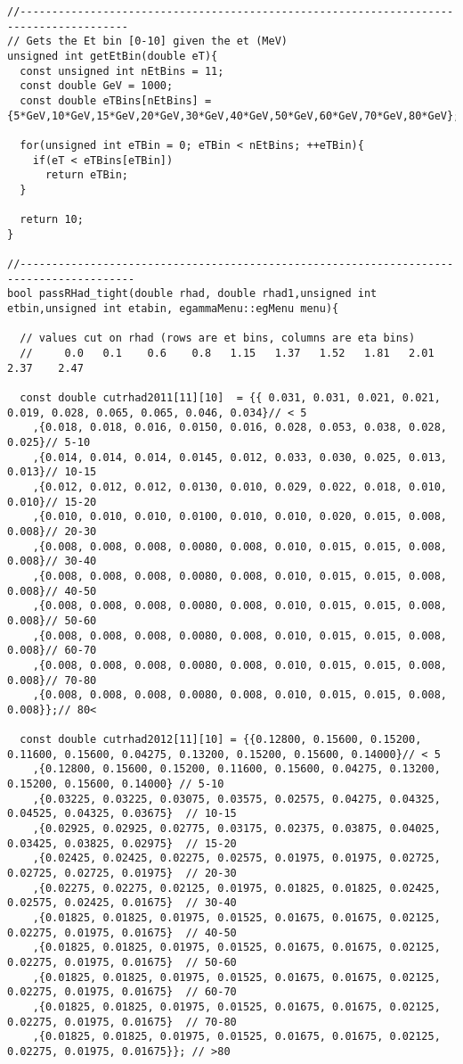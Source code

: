 \begin{lstlisting}
//---------------------------------------------------------------------------------------
// Gets the Et bin [0-10] given the et (MeV)
unsigned int getEtBin(double eT){
  const unsigned int nEtBins = 11;
  const double GeV = 1000;
  const double eTBins[nEtBins] = {5*GeV,10*GeV,15*GeV,20*GeV,30*GeV,40*GeV,50*GeV,60*GeV,70*GeV,80*GeV};
  
  for(unsigned int eTBin = 0; eTBin < nEtBins; ++eTBin){
    if(eT < eTBins[eTBin])
      return eTBin;
  }
  
  return 10;
}

//----------------------------------------------------------------------------------------
bool passRHad_tight(double rhad, double rhad1,unsigned int etbin,unsigned int etabin, egammaMenu::egMenu menu){
  
  // values cut on rhad (rows are et bins, columns are eta bins)
  //     0.0   0.1    0.6    0.8   1.15   1.37   1.52   1.81   2.01  2.37    2.47

  const double cutrhad2011[11][10]  = {{ 0.031, 0.031, 0.021, 0.021, 0.019, 0.028, 0.065, 0.065, 0.046, 0.034}// < 5
	,{0.018, 0.018, 0.016, 0.0150, 0.016, 0.028, 0.053, 0.038, 0.028, 0.025}// 5-10 
	,{0.014, 0.014, 0.014, 0.0145, 0.012, 0.033, 0.030, 0.025, 0.013, 0.013}// 10-15 
	,{0.012, 0.012, 0.012, 0.0130, 0.010, 0.029, 0.022, 0.018, 0.010, 0.010}// 15-20 
	,{0.010, 0.010, 0.010, 0.0100, 0.010, 0.010, 0.020, 0.015, 0.008, 0.008}// 20-30 
	,{0.008, 0.008, 0.008, 0.0080, 0.008, 0.010, 0.015, 0.015, 0.008, 0.008}// 30-40 
	,{0.008, 0.008, 0.008, 0.0080, 0.008, 0.010, 0.015, 0.015, 0.008, 0.008}// 40-50
	,{0.008, 0.008, 0.008, 0.0080, 0.008, 0.010, 0.015, 0.015, 0.008, 0.008}// 50-60 
	,{0.008, 0.008, 0.008, 0.0080, 0.008, 0.010, 0.015, 0.015, 0.008, 0.008}// 60-70 
	,{0.008, 0.008, 0.008, 0.0080, 0.008, 0.010, 0.015, 0.015, 0.008, 0.008}// 70-80 
	,{0.008, 0.008, 0.008, 0.0080, 0.008, 0.010, 0.015, 0.015, 0.008, 0.008}};// 80< 

  const double cutrhad2012[11][10] = {{0.12800, 0.15600, 0.15200, 0.11600, 0.15600, 0.04275, 0.13200, 0.15200, 0.15600, 0.14000}// < 5
	,{0.12800, 0.15600, 0.15200, 0.11600, 0.15600, 0.04275, 0.13200, 0.15200, 0.15600, 0.14000} // 5-10 
	,{0.03225, 0.03225, 0.03075, 0.03575, 0.02575, 0.04275, 0.04325, 0.04525, 0.04325, 0.03675}  // 10-15
	,{0.02925, 0.02925, 0.02775, 0.03175, 0.02375, 0.03875, 0.04025, 0.03425, 0.03825, 0.02975}  // 15-20
	,{0.02425, 0.02425, 0.02275, 0.02575, 0.01975, 0.01975, 0.02725, 0.02725, 0.02725, 0.01975}  // 20-30
	,{0.02275, 0.02275, 0.02125, 0.01975, 0.01825, 0.01825, 0.02425, 0.02575, 0.02425, 0.01675}  // 30-40
	,{0.01825, 0.01825, 0.01975, 0.01525, 0.01675, 0.01675, 0.02125, 0.02275, 0.01975, 0.01675}  // 40-50
	,{0.01825, 0.01825, 0.01975, 0.01525, 0.01675, 0.01675, 0.02125, 0.02275, 0.01975, 0.01675}  // 50-60
	,{0.01825, 0.01825, 0.01975, 0.01525, 0.01675, 0.01675, 0.02125, 0.02275, 0.01975, 0.01675}  // 60-70
	,{0.01825, 0.01825, 0.01975, 0.01525, 0.01675, 0.01675, 0.02125, 0.02275, 0.01975, 0.01675}  // 70-80
	,{0.01825, 0.01825, 0.01975, 0.01525, 0.01675, 0.01675, 0.02125, 0.02275, 0.01975, 0.01675}}; // >80
                                 


\end{lstlisting}
